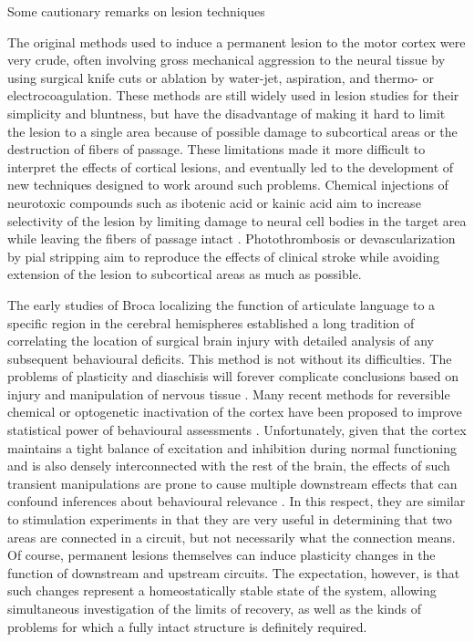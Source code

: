 \begin{featurebox}
\caption{Some cautionary remarks on lesion techniques}

The original methods used to induce a permanent lesion to the motor cortex were very crude, often involving gross mechanical aggression to the neural tissue by using surgical knife cuts or ablation by water-jet, aspiration, and thermo- or electrocoagulation. These methods are still widely used in lesion studies for their simplicity and bluntness, but have the disadvantage of making it hard to limit the lesion to a single area because of possible damage to subcortical areas or the destruction of fibers of passage. These limitations made it more difficult to interpret the effects of cortical lesions, and eventually led to the development of new techniques designed to work around such problems. Chemical injections of neurotoxic compounds such as ibotenic acid or kainic acid aim to increase selectivity of the lesion by limiting damage to neural cell bodies in the target area while leaving the fibers of passage intact \citep{Schwarcz1979}. Photothrombosis \citep{Watson1985} or devascularization by pial stripping \citep{Meyer1971} aim to reproduce the effects of clinical stroke while avoiding extension of the lesion to subcortical areas as much as possible.

The early studies of Broca localizing the function of articulate language to a specific region in the cerebral hemispheres \citep{Broca1861} established a long tradition of correlating the location of surgical brain injury with detailed analysis of any subsequent behavioural deficits. This method is not without its difficulties. The problems of plasticity and diaschisis will forever complicate conclusions based on injury and manipulation of nervous tissue \citep{Lashley1933}. Many recent methods for reversible chemical or optogenetic inactivation of the cortex have been proposed to improve statistical power of behavioural assessments \citep{DeFeudis1980,Dong2010,Guo2015}. Unfortunately, given that the cortex maintains a tight balance of excitation and inhibition during normal functioning and is also densely interconnected with the rest of the brain, the effects of such transient manipulations are prone to cause multiple downstream effects that can confound inferences about behavioural relevance \citep{Otchy2015}. In this respect, they are similar to stimulation experiments in that they are very useful in determining that two areas are connected in a circuit, but not necessarily what the connection means. Of course, permanent lesions themselves can induce plasticity changes in the function of downstream and upstream circuits. The expectation, however, is that such changes represent a homeostatically stable state of the system, allowing simultaneous investigation of the limits of recovery, as well as the kinds of problems for which a fully intact structure is definitely required.
\end{featurebox}
